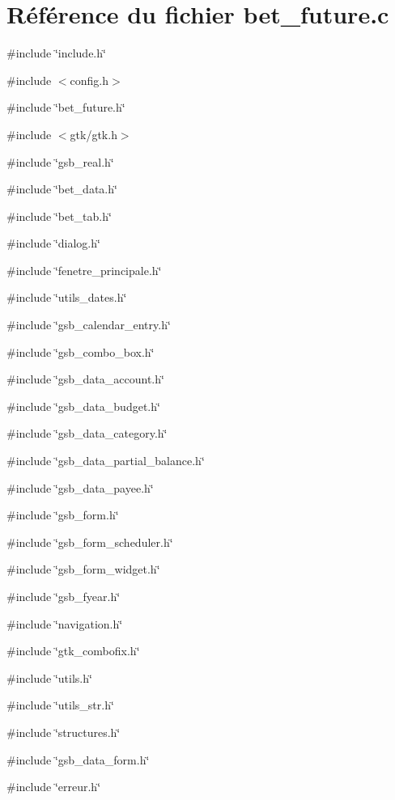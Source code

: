 \section{Référence du fichier bet\_\-future.c}
\label{bet__future_8c}
{\ttfamily \#include \char`\"{}include.h\char`\"{}}\par
{\ttfamily \#include $<$config.h$>$}\par
{\ttfamily \#include \char`\"{}bet\_\-future.h\char`\"{}}\par
{\ttfamily \#include $<$gtk/gtk.h$>$}\par
{\ttfamily \#include \char`\"{}gsb\_\-real.h\char`\"{}}\par
{\ttfamily \#include \char`\"{}bet\_\-data.h\char`\"{}}\par
{\ttfamily \#include \char`\"{}bet\_\-tab.h\char`\"{}}\par
{\ttfamily \#include \char`\"{}dialog.h\char`\"{}}\par
{\ttfamily \#include \char`\"{}fenetre\_\-principale.h\char`\"{}}\par
{\ttfamily \#include \char`\"{}utils\_\-dates.h\char`\"{}}\par
{\ttfamily \#include \char`\"{}gsb\_\-calendar\_\-entry.h\char`\"{}}\par
{\ttfamily \#include \char`\"{}gsb\_\-combo\_\-box.h\char`\"{}}\par
{\ttfamily \#include \char`\"{}gsb\_\-data\_\-account.h\char`\"{}}\par
{\ttfamily \#include \char`\"{}gsb\_\-data\_\-budget.h\char`\"{}}\par
{\ttfamily \#include \char`\"{}gsb\_\-data\_\-category.h\char`\"{}}\par
{\ttfamily \#include \char`\"{}gsb\_\-data\_\-partial\_\-balance.h\char`\"{}}\par
{\ttfamily \#include \char`\"{}gsb\_\-data\_\-payee.h\char`\"{}}\par
{\ttfamily \#include \char`\"{}gsb\_\-form.h\char`\"{}}\par
{\ttfamily \#include \char`\"{}gsb\_\-form\_\-scheduler.h\char`\"{}}\par
{\ttfamily \#include \char`\"{}gsb\_\-form\_\-widget.h\char`\"{}}\par
{\ttfamily \#include \char`\"{}gsb\_\-fyear.h\char`\"{}}\par
{\ttfamily \#include \char`\"{}navigation.h\char`\"{}}\par
{\ttfamily \#include \char`\"{}gtk\_\-combofix.h\char`\"{}}\par
{\ttfamily \#include \char`\"{}utils.h\char`\"{}}\par
{\ttfamily \#include \char`\"{}utils\_\-str.h\char`\"{}}\par
{\ttfamily \#include \char`\"{}structures.h\char`\"{}}\par
{\ttfamily \#include \char`\"{}gsb\_\-data\_\-form.h\char`\"{}}\par
{\ttfamily \#include \char`\"{}erreur.h\char`\"{}}\par
